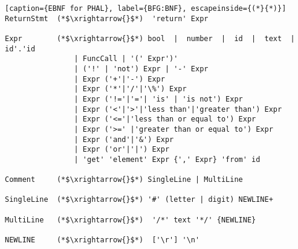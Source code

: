 \begin{lstlisting}[caption={EBNF for PHAL}, label={BFG:BNF}, escapeinside={(*}{*)}]
ReturnStmt  (*$\xrightarrow{}$*)  'return' Expr

Expr        (*$\xrightarrow{}$*) bool  |  number  |  id  |  text  |  id'.'id  
                | FuncCall | '(' Expr')'  
                | ('!' | 'not') Expr | '-' Expr
                | Expr ('+'|'-') Expr 
                | Expr ('*'|'/'|'\%') Expr  
                | Expr ('!='|'='| 'is' | 'is not') Expr
                | Expr ('<'|'>'|'less than'|'greater than') Expr
                | Expr ('<='|'less than or equal to') Expr
                | Expr ('>=' |'greater than or equal to') Expr 
                | Expr ('and'|'&') Expr  
                | Expr ('or'|'|') Expr
                | 'get' 'element' Expr {',' Expr} 'from' id

Comment     (*$\xrightarrow{}$*) SingleLine | MultiLine

SingleLine  (*$\xrightarrow{}$*) '#' (letter | digit) NEWLINE+

MultiLine   (*$\xrightarrow{}$*)  '/*' text '*/' {NEWLINE}

NEWLINE	    (*$\xrightarrow{}$*)  ['\r'] '\n'
\end{lstlisting}